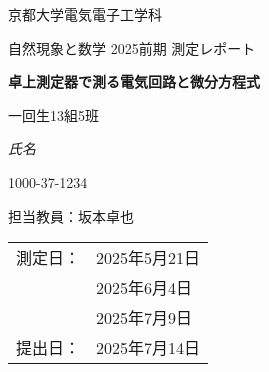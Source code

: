 \begin{titlepage}
	\centering
	\sffamily
	{\LARGE 京都大学電気電子工学科\par}
	\vspace{1cm}
	{\Large 自然現象と数学 2025前期 測定レポート\par}
	\vspace{1.5cm}
	{\huge\bfseries\sffamily\myB 卓上測定器で測る電気回路と微分方程式\par}
	\vspace{2cm}
	{\Large 一回生13組5班\par}
	{\Large\itshape 氏名\par}
	{\Large 1000-37-1234\par}
	\vfill
	{\large 担当教員：坂本\quad 卓也}

	\vfill

	{
		\begin{table}[H]
			\centering
			\large
			\sffamily
			\begin{tabular}{ll}
				測定日： & 2025年5月21日 \\
				     & 2025年6月4日  \\
				     & 2025年7月9日  \\
				提出日： & 2025年7月14日
			\end{tabular}
		\end{table}
	}

\end{titlepage}
